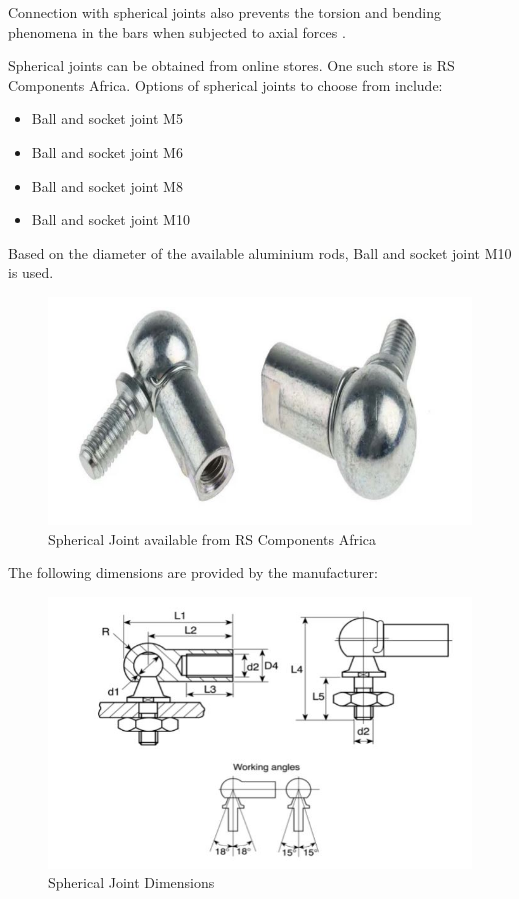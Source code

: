 Connection with spherical joints also prevents the torsion and bending phenomena in the bars when subjected to axial forces \cite{fernandes_design_nodate}.

Spherical joints can be obtained from online stores. One such store is RS Components Africa. Options of spherical joints to choose from include:
\begin{itemize}
\item Ball and socket joint M5
\item Ball and socket joint M6
\item Ball and socket joint M8
\item Ball and socket joint M10
\end{itemize}
Based on the diameter of the available aluminium rods, Ball and socket joint M10 is used.
\begin{center}
	\begin{figure}[H]
	\centering
	\includegraphics[width=0.6\linewidth]{Figures/Spherical}
	\caption[Spherical Joint]{Spherical Joint available from RS Components Africa \cite{datasheet_spherical}}
	\end{figure}
\end{center}
The following dimensions are provided by the manufacturer:
\begin{center}
	\begin{figure}[H]
	\centering
	\includegraphics[width=0.8\linewidth]{Figures/Spherical Dimensions}
	\caption[Spherical Joint Dimensions]{Spherical Joint Dimensions \cite{datasheet_spherical}}
	\end{figure}
\end{center}
